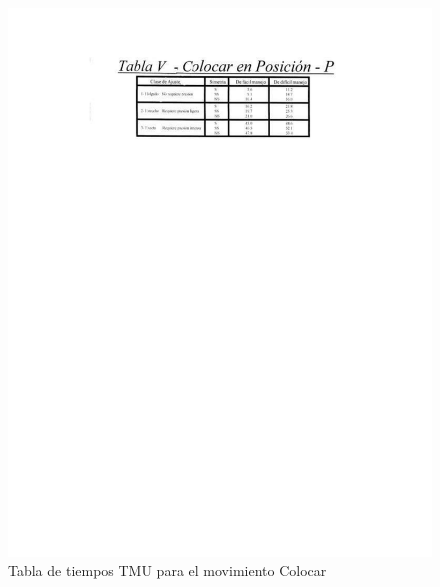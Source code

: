         \begin{figure}[H]
        \centering
        \includegraphics[trim = {42mm 210mm 42mm 24mm},clip,scale=0.6]{19/Img/tablaColocar.pdf}
        \caption{Tabla de tiempos TMU para el movimiento Colocar}
        \label{fig:tablaColocar}
    \end{figure}
